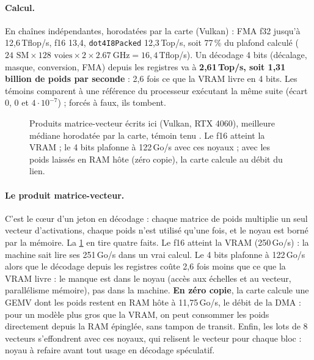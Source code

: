 \paragraph{Calcul.} En chaînes indépendantes, horodatées par la carte (Vulkan) : FMA f32 jusqu'à 12,6\,Tflop/s, f16 13,4, \texttt{dot4I8Packed} 12,3\,Top/s, soit 77\,\% du plafond calculé ($24 \text{ SM} \times 128 \text{ voies} \times 2 \times \SI{2.67}{\giga\hertz} = 16{,}4$\,Tflop/s). Un décodage 4 bits (décalage, masque, conversion, FMA) depuis les registres va à \textbf{2,61\,Top/s, soit 1,31 billion de poids par seconde} : 2,6 fois ce que la VRAM livre en 4 bits. Les témoins comparent à une référence du processeur exécutant la même suite (écart 0, 0 et $4\cdot10^{-7}$) ; forcés à faux, ils tombent.

\begin{figure}[ht]
\centering
\GrapheGEMV
\caption[Produits matrice-vecteur écrits ici, sur la RTX 4060]{Produits matrice-vecteur écrits ici (Vulkan, RTX 4060), meilleure médiane horodatée par la carte, témoin tenu \mes. Le f16 atteint la VRAM ; le 4 bits plafonne à 122\,Go/s avec ces noyaux ; avec les poids laissés en RAM hôte (zéro copie), la carte calcule au débit du lien.}
\label{fig:gemv-machine}
\end{figure}

\paragraph{Le produit matrice-vecteur.} C'est le cœur d'un jeton en décodage : chaque matrice de poids multiplie un seul vecteur d'activations, chaque poids n'est utilisé qu'une fois, et le noyau est borné par la mémoire. La \cref{fig:gemv-machine} en tire quatre faits. Le f16 atteint la VRAM (250\,Go/s) : la machine sait lire ses 251\,Go/s dans un vrai calcul. Le 4 bits plafonne à 122\,Go/s alors que le décodage depuis les registres coûte 2,6 fois moins que ce que la VRAM livre : le manque est dans le noyau (accès aux échelles et au vecteur, parallélisme mémoire), pas dans la machine. \textbf{En zéro copie}, la carte calcule une GEMV dont les poids restent en RAM hôte à 11,75\,Go/s, le débit de la DMA : pour un modèle plus gros que la VRAM, on peut consommer les poids directement depuis la RAM épinglée, sans tampon de transit. Enfin, les lots de 8 vecteurs s'effondrent avec ces noyaux, qui relisent le vecteur pour chaque bloc : noyau à refaire avant tout usage en décodage spéculatif.

